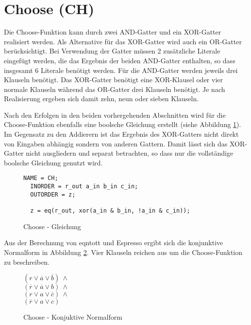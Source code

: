 \section{Choose (CH)}
\label{sec:knf:ch}

Die Choose-Funktion kann durch zwei AND-Gatter und ein XOR-Gatter realisiert werden. Als Alternative für das XOR-Gatter wird auch ein OR-Gatter berücksichtigt.
Bei Verwendung der Gatter müssen 2 zusätzliche Literale eingefügt werden, die das Ergebnis der beiden AND-Gatter enthalten, so dass insgesamt 6 Literale benötigt werden.
Für die AND-Gatter werden jeweils drei Klauseln benötigt. Das XOR-Gatter benötigt eine XOR-Klausel oder vier normale Klauseln während das OR-Gatter drei Klauseln benötigt.
Je nach Realisierung ergeben sich damit zehn, neun oder sieben Klauseln.

Nach den Erfolgen in den beiden vorhergehenden Abschnitten wird für die Choose-Funktion ebenfalls eine boolsche Gleichung erstellt (siehe Abbildung \ref{fig:choose_eqn}).
Im Gegensatz zu den Addierern ist das Ergebnis des XOR-Gatters nicht direkt von Eingaben abhängig sondern von anderen Gattern. Damit lässt sich das XOR-Gatter nicht
ausgliedern und separat betrachten, so dass nur die vollständige boolsche Gleichung genutzt wird.
\begin{figure}[!h]
  \centering
  \begin{lstlisting}[]
  NAME = CH;
  INORDER = r_out a_in b_in c_in;
  OUTORDER = z;

  z = eq(r_out, xor(a_in & b_in, !a_in & c_in));
  \end{lstlisting}
  \caption{Choose - Gleichung}
  \label{fig:choose_eqn}
\end{figure}

Aus der Berechnung von eqntott und Espresso ergibt sich die konjunktive Normalform in Abbildung \ref{fig:choose_cnf}.
Vier Klauseln reichen aus um die Choose-Funktion zu beschreiben.
\begin{figure}[!h]
  \centering
  \begin{minipage}[l]{2cm}
    $ (r \vee \overline{a} \vee \overline{b}) ~ \wedge $\\
    $ (\overline{r} \vee \overline{a} \vee b) ~ \wedge $\\
    $ (r \vee a \vee \overline{c}) ~ \wedge $\\
    $ (\overline{r} \vee a \vee c) $
  \end{minipage}
  \caption{Choose - Konjuktive Normalform}
  \label{fig:choose_cnf}
\end{figure}


